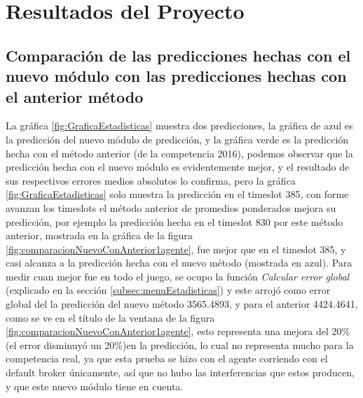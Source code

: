 \chapter{Resultados del Proyecto}

\section{Comparación de las predicciones hechas con el nuevo módulo con las predicciones hechas con el anterior método } \label{subsec:ComparacionesNuevoYviejoMetodo}

La gráfica \ref{fig:GraficaEstadisticas} muestra dos predicciones, la gráfica de azul es la predicción del nuevo módulo de predicción, y la gráfica verde es la predicción hecha con el método anterior (de la competencia 2016), podemos observar que la predicción hecha con el nuevo módulo es evidentemente mejor, y el resultado de sus respectivos errores medios absolutos lo confirma, pero la gráfica \ref{fig:GraficaEstadisticas} solo muestra la predicción en el timeslot 385, con forme avanzan los timeslots el método anterior de promedios ponderados mejora su predicción, por ejemplo la predicción hecha en el timeslot 830 por este método anterior, mostrada en la gráfica de la figura \ref{fig:comparacionNuevoConAnterior1agente}, fue mejor que en el timeslot 385, y casi alcanza a la predicción hecha con el nuevo método (mostrada en azul). Para medir cuan mejor fue en todo el juego, se ocupo la función \textit{Calcular error global} (explicado en la sección \ref{subsec:menuEstadisticas}) y este arrojó como error global del la predicción del nuevo método 3565.4893, y para el anterior 4424.4641, como se ve en el título de la ventana de la figura \ref{fig:comparacionNuevoConAnterior1agente}, esto representa una mejora del 20\% (el error disminuyó un 20\%)en la predicción, lo cual no representa mucho para la competencia real, ya que esta prueba se hizo con el agente corriendo con el default broker únicamente, así que no hubo las interferencias que estos producen, y que este nuevo módulo tiene en cuenta.


